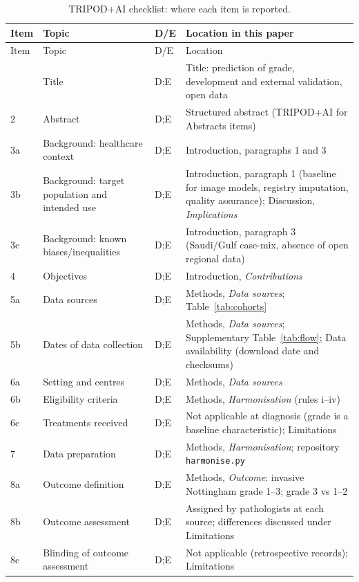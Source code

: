 \begin{longtable}{p{0.6cm}p{3.0cm}p{0.8cm}p{7.5cm}}
\caption{TRIPOD+AI checklist: where each item is reported.}\label{tab:tripod}\\
\toprule
Item & Topic & D/E & Location in this paper \\
\midrule\endfirsthead
\toprule Item & Topic & D/E & Location \\ \midrule\endhead
\bottomrule\endfoot
1 & Title & D;E & Title: prediction of grade, development and external validation, open data \\
2 & Abstract & D;E & Structured abstract (TRIPOD+AI for Abstracts items) \\
3a & Background: healthcare context & D;E & Introduction, paragraphs 1 and 3 \\
3b & Background: target population and intended use & D;E & Introduction, paragraph 1 (baseline for image models, registry imputation, quality assurance); Discussion, \emph{Implications} \\
3c & Background: known biases/inequalities & D;E & Introduction, paragraph 3 (Saudi/Gulf case-mix, absence of open regional data) \\
4 & Objectives & D;E & Introduction, \emph{Contributions} \\
5a & Data sources & D;E & Methods, \emph{Data sources}; Table~\ref{tab:cohorts} \\
5b & Dates of data collection & D;E & Methods, \emph{Data sources}; Supplementary Table~\ref{tab:flow}; Data availability (download date and checksums) \\
6a & Setting and centres & D;E & Methods, \emph{Data sources} \\
6b & Eligibility criteria & D;E & Methods, \emph{Harmonisation} (rules i--iv) \\
6c & Treatments received & D;E & Not applicable at diagnosis (grade is a baseline characteristic); Limitations \\
7 & Data preparation & D;E & Methods, \emph{Harmonisation}; repository \texttt{harmonise.py} \\
8a & Outcome definition & D;E & Methods, \emph{Outcome}: invasive Nottingham grade 1--3; grade 3 vs 1--2 \\
8b & Outcome assessment & D;E & Assigned by pathologists at each source; differences discussed under Limitations \\
8c & Blinding of outcome assessment & D;E & Not applicable (retrospective records); Limitations \\

\end{longtable}

